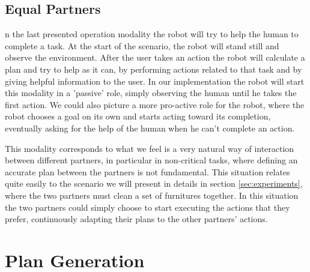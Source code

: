 \subsection{Equal Partners}
n the last presented operation modality the robot will try to help
the human to complete a task. At the start of the scenario, the robot
will stand still and observe the environment. After the user takes an
action the robot will calculate a plan and try to help as it can, by
performing actions related to that task and by giving helpful information to
the user. In our implementation the robot will start
this modality in a 'passive' role, simply observing the human until he
takes the first action. We could also picture a more pro-active role for
the robot, where the robot chooses a goal on its own and starts acting toward its
completion, eventually asking for the help of the human when he can't
complete an action. 

This modality corresponds to what we feel is a very natural way of
interaction between different partners, in particular in non-critical
tasks, where defining an accurate plan between the partners is not
fundamental. This situation relates quite easily to the scenario we
will present in details in section \ref{sec:experiments}, where the
two partners must clean a set of furnitures together. In this
situation the two partners could simply choose to start executing the
actions that they prefer, continuously adapting their plans to the
other partners' actions.  


\section{Plan Generation}
